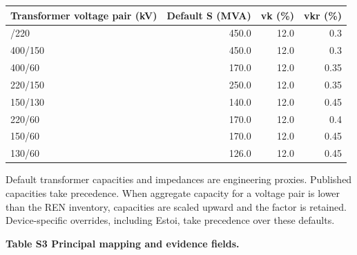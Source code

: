 \documentclass[
  10pt]{article}
\begin{document}
\begin{longtable}[]{@{}lrrr@{}}
\toprule\noalign{}
Transformer voltage pair (kV) & Default S (MVA) & vk (\%) & vkr (\%) \\
\midrule\noalign{}
\endhead
\bottomrule\noalign{}
\endlastfoot
400/220 & 450.0 & 12.0 & 0.3 \\
400/150 & 450.0 & 12.0 & 0.3 \\
400/60 & 170.0 & 12.0 & 0.35 \\
220/150 & 250.0 & 12.0 & 0.35 \\
150/130 & 140.0 & 12.0 & 0.45 \\
220/60 & 170.0 & 12.0 & 0.4 \\
150/60 & 170.0 & 12.0 & 0.45 \\
130/60 & 126.0 & 12.0 & 0.45 \\
\end{longtable}

Default transformer capacities and impedances are engineering proxies.
Published capacities take precedence. When aggregate capacity for a
voltage pair is lower than the REN inventory, capacities are scaled
upward and the factor is retained. Device-specific overrides, including
Estoi, take precedence over these defaults.

\textbf{Table S3 \textbar{} Principal mapping and evidence fields.}
\end{document}
